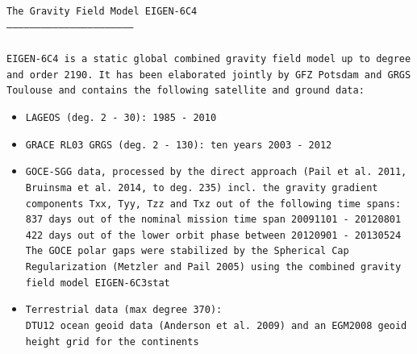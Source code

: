 \documentclass[a4paper, 12pt]{book}
\begin{document}
\noindent\texttt{The Gravity Field Model EIGEN-6C4\\
\noindent -----------------------------------------------------------------\\
\\
\noindent EIGEN-6C4 is a~static global combined gravity field model up to 
degree and order 2190.  It has been elaborated jointly  by GFZ Potsdam and GRGS 
Toulouse and contains the following  satellite and ground data:\\
}
\begin{itemize}[leftmargin=*,noitemsep,topsep=0pt]
\renewcommand\labelitemi{\texttt{-}}
\item \texttt{LAGEOS (deg. 2 - 30): 1985 - 2010
\\}

\item \texttt{GRACE RL03 GRGS (deg. 2 - 130): ten years 2003 - 2012\\}

\item \texttt{GOCE-SGG data, processed by the direct approach (Pail et 
al. 2011, Bruinsma et al. 2014, to deg. 235) incl. the gravity gradient 
components Txx, Tyy, Tzz and Txz out of the following time spans: 837 days out 
of the nominal mission time span 20091101 - 20120801 422 days out of the lower 
orbit phase between 20120901 - 20130524 The GOCE polar gaps were stabilized by 
the Spherical Cap Regularization (Metzler and Pail 2005) using the combined 
gravity field model EIGEN-6C3stat\\}

\item \texttt{Terrestrial data (max degree 370):
\\
DTU12 ocean geoid data (Anderson et al. 2009) and an EGM2008 geoid height grid 
for the continents}
\end{itemize}
\end{document}
